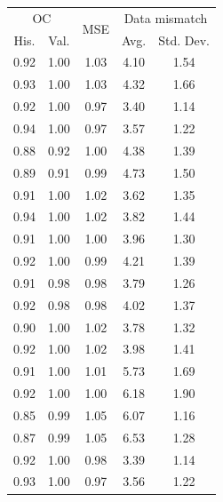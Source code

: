 \begin{tabular}{ccccc}
\toprule
\multicolumn{2}{c}{OC} & 
\multirow{2}{*}{
    MSE
} & 
\multicolumn{2}{c}{Data mismatch} 
\\
His. & Val. &  & Avg. & Std. Dev.
\\
\midrule
0.92 & 1.00 & 1.03 & 4.10 & 1.54 \\
0.93 & 1.00 & 1.03 & 4.32 & 1.66 \\
\midrule
0.92 & 1.00 & 0.97 & 3.40 & 1.14 \\
0.94 & 1.00 & 0.97 & 3.57 & 1.22 \\
\midrule
0.88 & 0.92 & 1.00 & 4.38 & 1.39 \\
0.89 & 0.91 & 0.99 & 4.73 & 1.50 \\
\midrule
0.91 & 1.00 & 1.02 & 3.62 & 1.35 \\
0.94 & 1.00 & 1.02 & 3.82 & 1.44 \\
\midrule
0.91 & 1.00 & 1.00 & 3.96 & 1.30 \\
0.92 & 1.00 & 0.99 & 4.21 & 1.39 \\
\midrule
0.91 & 0.98 & 0.98 & 3.79 & 1.26 \\
0.92 & 0.98 & 0.98 & 4.02 & 1.37 \\
\midrule
0.90 & 1.00 & 1.02 & 3.78 & 1.32 \\
0.92 & 1.00 & 1.02 & 3.98 & 1.41 \\
\midrule
0.91 & 1.00 & 1.01 & 5.73 & 1.69 \\
0.92 & 1.00 & 1.00 & 6.18 & 1.90 \\
\midrule
0.85 & 0.99 & 1.05 & 6.07 & 1.16 \\
0.87 & 0.99 & 1.05 & 6.53 & 1.28 \\
\midrule
0.92 & 1.00 & 0.98 & 3.39 & 1.14 \\
0.93 & 1.00 & 0.97 & 3.56 & 1.22 \\
\bottomrule
\end{tabular}

